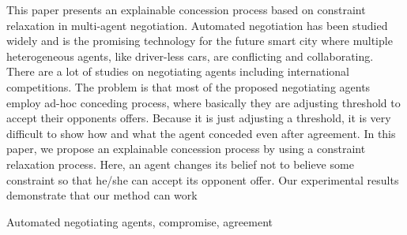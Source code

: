 \documentclass[paper]{ieice}
\title{}
\begin{document}
\maketitle
\begin{summary}
This paper presents an explainable concession process based on constraint relaxation in multi-agent negotiation. Automated negotiation has been studied widely and is the promising technology for the future smart city where multiple heterogeneous agents, like driver-less cars, are conflicting and collaborating.
There are a lot of studies on negotiating agents including international competitions.
The problem is that most of the proposed negotiating agents employ ad-hoc conceding process, where basically they are adjusting threshold to accept their opponents offers. Because it is just adjusting a threshold, it is very difficult to show how and what the agent conceded even after agreement. In this paper, we propose an explainable concession process by using a constraint relaxation process. Here, an agent changes its belief not to believe some constraint so that he/she can accept its opponent offer. Our experimental results demonstrate that our method can work 
\end{summary}
\begin{keywords}
Automated negotiating agents,
compromise,
agreement
\end{keywords}
\end{document}
